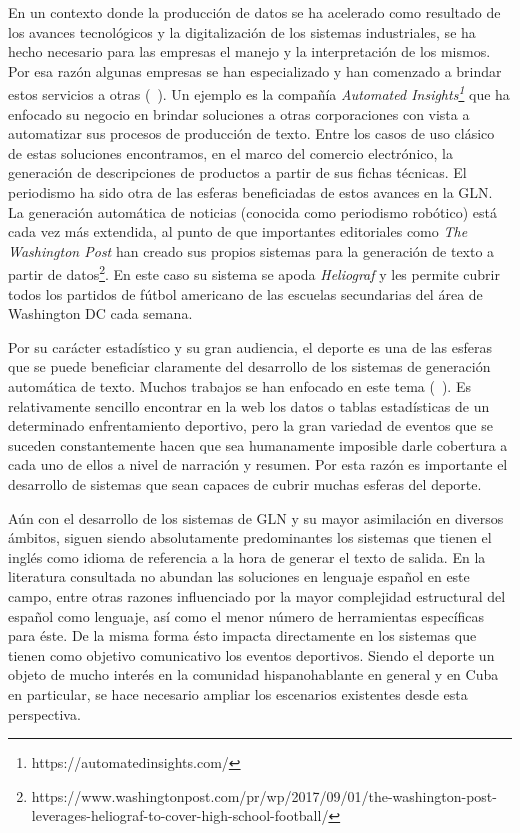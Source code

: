     En un contexto donde la producción de datos se ha acelerado como resultado de los avances tecnológicos y la digitalización de los sistemas industriales, se ha hecho necesario para 
las empresas el manejo y la interpretación de los mismos. Por esa raz\'on algunas empresas se han especializado y han comenzado a brindar estos servicios a otras (~\cite{dale2020natural}). Un ejemplo es la compañía 
\textit{Automated Insights\footnote[1]{https://automatedinsights.com/}} que ha enfocado su negocio en brindar soluciones a otras corporaciones con vista a automatizar sus 
procesos de producción de texto. Entre los casos de uso clásico de estas soluciones encontramos, en el marco del comercio electr\'onico, la generación de descripciones de 
productos a partir de sus fichas técnicas. El periodismo ha sido otra de las esferas beneficiadas de estos avances en la GLN. La generación automática de noticias (conocida como 
periodismo robótico) está cada vez más extendida, al punto de que importantes editoriales como \textit{The Washington Post} han creado sus propios sistemas para la generación de 
texto a partir de datos\footnote[2]{https://www.washingtonpost.com/pr/wp/2017/09/01/the-washington-post-leverages-heliograf-to-cover-high-school-football/}. 
En este caso su sistema se apoda \textit{Heliograf} y les permite cubrir todos los partidos de fútbol americano de las escuelas secundarias del área de Washington DC 
cada semana.

    Por su carácter estadístico y su gran audiencia, el deporte es una de las esferas que se puede beneficiar claramente del desarrollo de los sistemas 
de generación automática de texto. Muchos trabajos se han enfocado en este tema (~\cite{theune2001data, van2017pass, gunasiri2021automated,}).  Es relativamente sencillo encontrar en la web 
los datos o tablas estadísticas de un determinado enfrentamiento deportivo, pero la gran variedad de eventos que se suceden constantemente hacen 
que sea humanamente imposible darle cobertura a cada uno de ellos a nivel de narración y resumen. Por esta razón es importante el desarrollo 
de sistemas que sean capaces de cubrir muchas esferas del deporte.



    Aún con el desarrollo de los sistemas de GLN y su mayor asimilación en diversos ámbitos, siguen siendo absolutamente predominantes los 
sistemas que tienen el inglés como idioma de referencia a la hora de generar el texto de salida. En la literatura consultada no abundan las soluciones 
en lenguaje español en este campo, entre otras razones influenciado por la mayor complejidad estructural del español como lenguaje, así como el menor número 
de herramientas específicas para éste. De la misma forma ésto impacta directamente en los sistemas que tienen como objetivo comunicativo los eventos deportivos. Siendo el deporte un objeto de mucho interés en la 
comunidad hispanohablante en general y en Cuba en particular, se hace necesario ampliar los escenarios existentes desde esta perspectiva.

